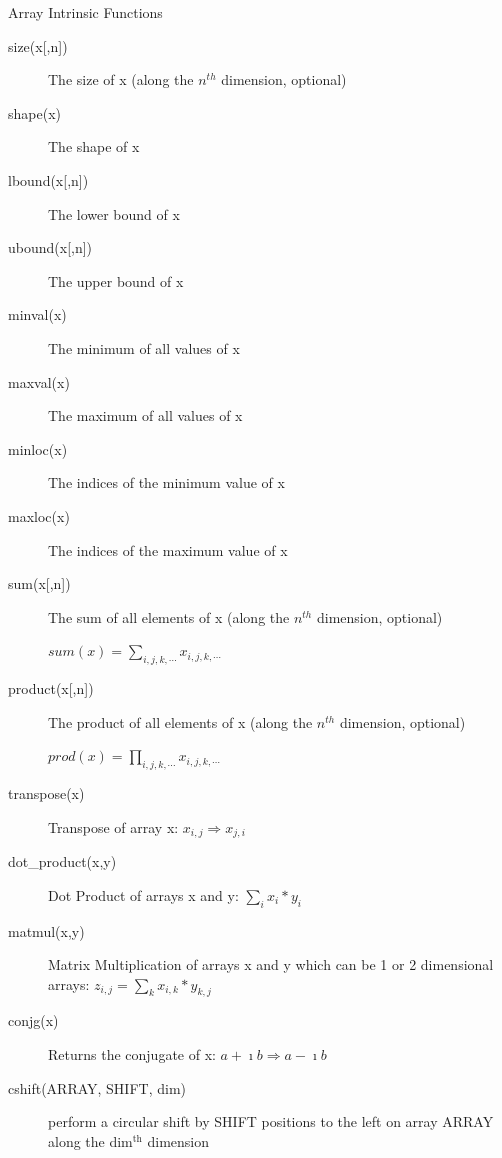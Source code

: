 \documentclass[10pt,t]{beamer}
\begin{document}
\begin{frame}[allowframebreaks]{Array Intrinsic Functions}
  \begin{description}
    \item[{size(x[,n])}] The size of x (along the $n^{th}$ dimension, optional)
    \item[shape(x)] The shape of x
    \item[{lbound(x[,n])}] The lower bound of x
    \item[{ubound(x[,n])}] The upper bound of x
    \item[minval(x)] The minimum of all values of x
    \item[maxval(x)] The maximum of all values of x
    \item[minloc(x)] The indices of the minimum value of x
    \item[maxloc(x)] The indices of the maximum value of x
    \item[{sum(x[,n])}] The sum of all elements of x (along the $n^{th}$ dimension, optional)
    \item[] $sum(x) = \sum_{i,j,k,\cdots}x_{i,j,k,\cdots}$
      \framebreak
    \item[{product(x[,n])}] The product of all elements of x (along the $n^{th}$ dimension, optional)
    \item[] $prod(x) = \prod_{i,j,k,\cdots}x_{i,j,k,\cdots}$
    \item[transpose(x)] Transpose of array x: $ x_{i,j}\Rightarrow x_{j,i}$
    \item[dot\_product(x,y)] Dot Product of arrays x and y: $ \sum_{i} x_i* y_i $
    \item[matmul(x,y)] Matrix Multiplication of arrays x and y which can be 1 or 2 dimensional arrays: $ z_{i,j} = \sum_k x_{i,k} * y_{k,j}$
    \item[conjg(x)] Returns the conjugate of x: $ a + \imath b \Rightarrow a - \imath b$
    \item[cshift(ARRAY, SHIFT, dim)] perform a circular shift by SHIFT positions to the left on array ARRAY along the dim$^{\mathrm{th}}$ dimension
  \end{description}
\end{frame}
\end{document}
